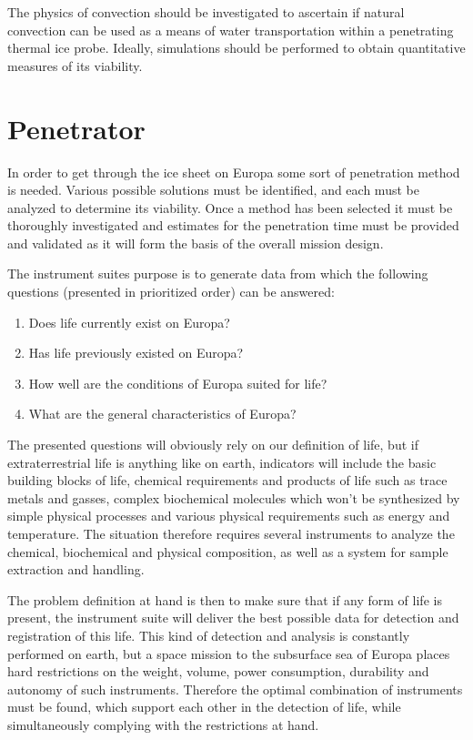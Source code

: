 The physics of convection should be investigated to ascertain if natural convection can be used as a means of water transportation within a penetrating thermal ice probe. Ideally, simulations should be performed to obtain quantitative measures of its viability.

\section{Penetrator}
In order to get through the ice sheet on Europa some sort of penetration method is needed. Various possible solutions must be identified, and each must be analyzed to determine its viability. Once a method has been selected it must be thoroughly investigated and estimates for the penetration time must be provided and validated as it will form the basis of the overall mission design.

The instrument suites purpose is to generate data from which the following questions (presented in prioritized order) can be answered:
\begin{enumerate}
    \item Does life currently exist on Europa?
    \item Has life previously existed on Europa?
    \item How well are the conditions of Europa suited for life?
    \item What are the general characteristics of Europa?
\end{enumerate}

The presented questions will obviously rely on our definition of life, but if extraterrestrial life is anything like on earth, indicators will include the basic building blocks of life, chemical requirements and products of life such as trace metals and gasses, complex biochemical molecules which won’t be synthesized by simple physical processes and various physical requirements such as energy and temperature. The situation therefore requires several instruments to analyze the chemical, biochemical and physical composition, as well as a system for sample extraction and handling.

The problem definition at hand is then to make sure that if any form of life is present, the instrument suite will deliver the best possible data for detection and registration of this life. This kind of detection and analysis is constantly performed on earth, but a space mission to the subsurface sea of Europa places hard restrictions on the weight, volume, power consumption, durability and autonomy of such instruments. Therefore the optimal combination of instruments must be found, which support each other in the detection of life, while simultaneously complying with the restrictions at hand. 

